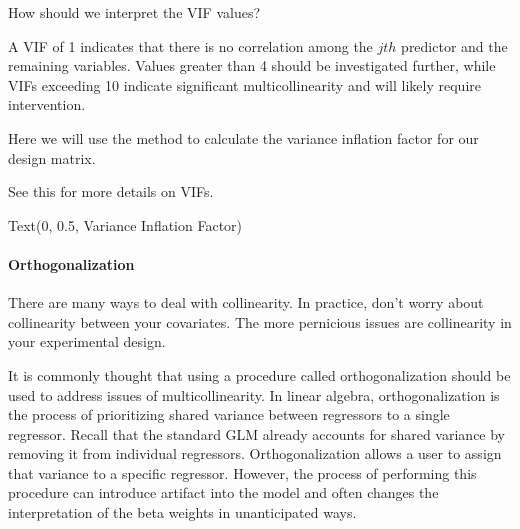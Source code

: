 \documentclass[letterpaper,10pt,english]{sphinxmanual}
\begin{document}
How should we interpret the VIF values?

A VIF of 1 indicates that there is no correlation among the \(jth\) predictor and the remaining variables. Values greater than 4 should be investigated further, while VIFs exceeding 10 indicate significant multicollinearity and will likely require intervention.

Here we will use the  method to calculate the variance inflation factor for our design matrix.

See this  for more details on VIFs.

\begin{sphinxVerbatim}[commandchars=\\\{\}]
  
\end{sphinxVerbatim}

\begin{sphinxVerbatim}[commandchars=\\\{\}]
Text(0, 0.5, \PYGZsq{}Variance Inflation Factor\PYGZsq{})
\end{sphinxVerbatim}

\noindent{}


\paragraph{Orthogonalization}
\label{\detokenize{content/GLM_Single_Subject_Model:orthogonalization}}
There are many ways to deal with collinearity. In practice, don’t worry about collinearity between your covariates. The more pernicious issues are collinearity in your experimental design.

It is commonly thought that using a procedure called orthogonalization should be used to address issues of multicollinearity. In linear algebra, orthogonalization is the process of prioritizing shared variance between regressors to a single regressor. Recall that the standard GLM already accounts for shared variance by removing it from individual regressors. Orthogonalization allows a user to assign that variance to a specific regressor. However, the process of performing this procedure can introduce artifact into the model and often changes the interpretation of the beta weights in unanticipated ways.
\end{document}
